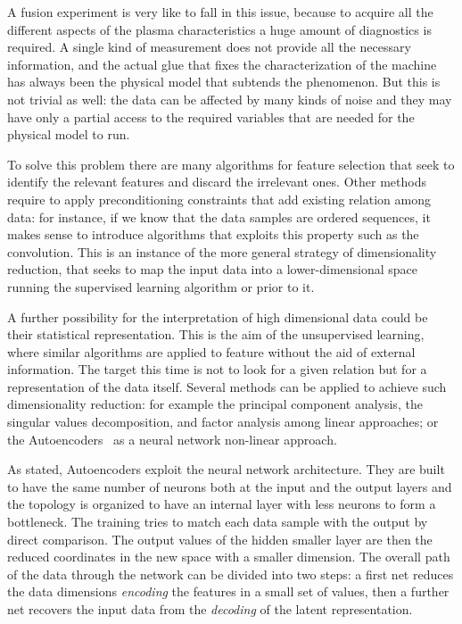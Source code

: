 A fusion experiment is very like to fall in this issue, because to acquire all the different aspects of the plasma characteristics a huge amount of diagnostics is required. A single kind of measurement does not provide all the necessary information, and the actual glue that fixes the characterization of the machine has always been the physical model that subtends the phenomenon.
But this is not trivial as well: the data can be affected by many kinds of noise and they may have only a partial access to the required variables that are needed for the physical model to run.

To solve this problem there are many algorithms for feature selection that seek to identify the relevant features and discard the irrelevant ones. 
Other methods require to apply preconditioning constraints that add existing relation among data: for instance, if we know that the data samples are ordered sequences, it makes sense to introduce algorithms that exploits this property such as the convolution.
This is an instance of the more general strategy of dimensionality reduction, that seeks to map the input data into a lower-dimensional space running the supervised learning algorithm or prior to it. 

A further possibility for the interpretation of high dimensional data could be their statistical representation.
This is the aim of the unsupervised learning, where similar algorithms are applied to feature without the aid of external information. The target this time is not to look for a given relation but for a representation of the data itself.
Several methods can be applied to achieve such dimensionality reduction: for example the principal component analysis, the singular values decomposition, and factor analysis among linear approaches; or the Autoencoders~\cite{Hinton504} as a neural network non-linear approach.

As stated, Autoencoders exploit the neural network architecture. They are built to have the same number of neurons both at the input and the output layers and the topology is organized to have an internal layer with less neurons to form a bottleneck. The training tries to match each data sample with the output by direct comparison.
The output values of the hidden smaller layer are then the reduced coordinates in the new space with a smaller dimension.
The overall path of the data through the network can be divided into two steps: a first net reduces the data dimensions \textit{encoding} the features in a small set of values, then a further net recovers the input data from the \textit{decoding} of the latent representation. 

